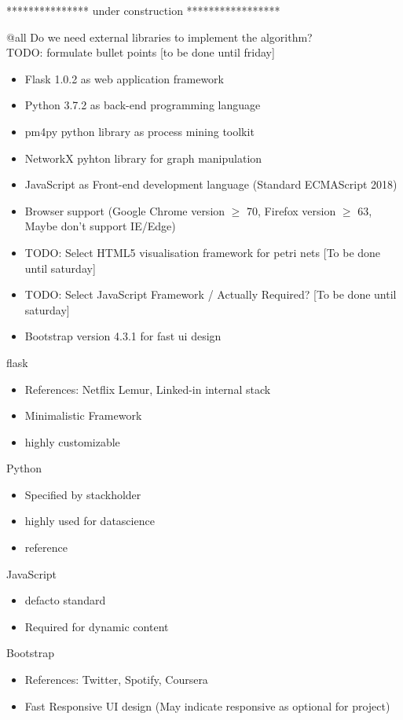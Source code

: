 \documentclass[notitlepage]{article}
\begin{document}
\begin{flushleft}
{\color{gray} *************** under construction *****************}

{\color{red} @all Do we need external libraries to implement the algorithm?}\\
{\color{red} TODO: formulate bullet points [to be done until friday]}

\begin{itemize}
	\item Flask 1.0.2 as web application framework
	\item Python 3.7.2 as back-end programming language
	\item pm4py python library as process mining toolkit
    \item NetworkX pyhton library for graph manipulation
	\item JavaScript as Front-end development language (Standard ECMAScript 2018)
	\item Browser support (Google Chrome version $\geq$ 70, Firefox version $\geq$ 63, Maybe don't support IE/Edge)
	\item {\color{red} TODO: Select HTML5 visualisation framework for petri nets [To be done until saturday]}
	\item {\color{red} TODO: Select JavaScript Framework / Actually Required? [To be done until saturday]}
	\item Bootstrap version 4.3.1 for fast ui design
\end{itemize}

\large{flask}
\begin{itemize}
	\item References: Netflix Lemur, Linked-in internal stack
	\item Minimalistic Framework
	\item highly customizable
\end{itemize}

\large{Python}
\begin{itemize}
	\item Specified by stackholder
	\item highly used for datascience
	\item reference
\end{itemize}

\large{JavaScript}
\begin{itemize}
	\item defacto standard
	\item Required for dynamic content
\end{itemize}

\large{Bootstrap}
\begin{itemize}
	\item References: Twitter, Spotify, Coursera
	\item Fast Responsive UI design (May indicate responsive as optional for project)
\end{itemize}


\end{flushleft}
\end{document}
